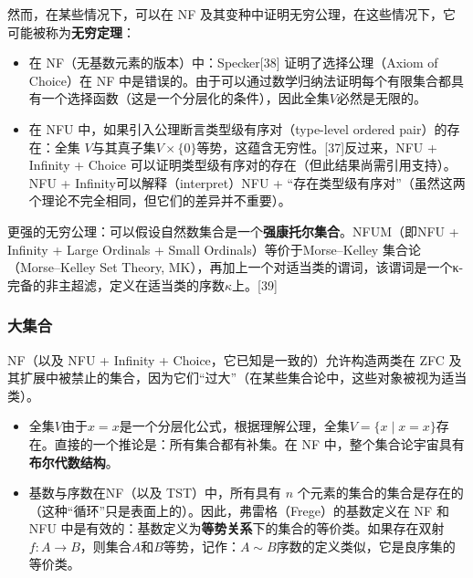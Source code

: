 然而，在某些情况下，可以在 NF 及其变种中证明无穷公理，在这些情况下，它可能被称为\textbf{无穷定理}：
\begin{itemize}
\item 在 NF（无基数元素的版本）中：Specker[38] 证明了选择公理（Axiom of Choice）在 NF 中是错误的。由于可以通过数学归纳法证明每个有限集合都具有一个选择函数（这是一个分层化的条件），因此全集\(V\)必然是无限的。
\item 在 NFU 中，如果引入公理断言类型级有序对（type-level ordered pair）的存在：全集 \(V\)与其真子集\( V \times \{0\} \)等势，这蕴含无穷性。[37]反过来，NFU + Infinity + Choice 可以证明类型级有序对的存在（但此结果尚需引用支持）。NFU + Infinity可以解释（interpret）NFU + “存在类型级有序对”（虽然这两个理论不完全相同，但它们的差异并不重要）。
\end{itemize}
更强的无穷公理：可以假设自然数集合是一个\textbf{强康托尔集合}。NFUM（即NFU + Infinity + Large Ordinals + Small Ordinals）等价于Morse–Kelley 集合论（Morse–Kelley Set Theory, MK），再加上一个对适当类的谓词，该谓词是一个κ-完备的非主超滤，定义在适当类的序数\(\kappa\)上。[39]
\subsubsection{大集合}
NF（以及 NFU + Infinity + Choice，它已知是一致的）允许构造两类在 ZFC 及其扩展中被禁止的集合，因为它们“过大”（在某些集合论中，这些对象被视为适当类）。
\begin{itemize}
\item 全集\( V \)由于\( x = x \)是一个分层化公式，根据理解公理，全集\(V = \{x \mid x = x\}\)存在。直接的一个推论是：所有集合都有补集。在 NF 中，整个集合论宇宙具有\textbf{布尔代数结构}。
\item 基数与序数在NF（以及 TST）中，所有具有 \( n \) 个元素的集合的集合是存在的（这种“循环”只是表面上的）。因此，弗雷格（Frege）的基数定义在 NF 和 NFU 中是有效的：基数定义为\textbf{等势关系}下的集合的等价类。如果存在双射\( f: A \to B\)，则集合\( A \)和\( B \)等势，记作：\(A \sim B\)序数的定义类似，它是良序集的等价类。
\end{itemize}